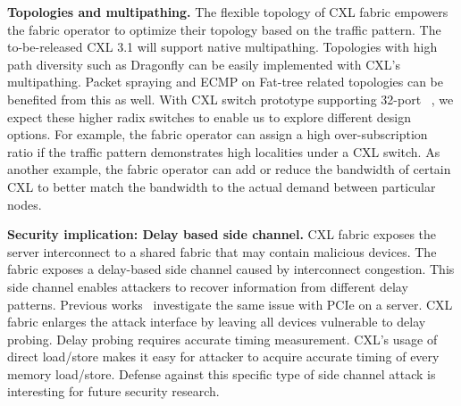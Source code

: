 \noindent \textbf{Topologies and multipathing.}
The flexible topology of CXL fabric empowers the fabric operator to optimize their topology based on the traffic pattern. 
%
The to-be-released CXL 3.1 will support native multipathing. Topologies with high path diversity such as Dragonfly can be easily implemented with CXL's multipathing. 
%
Packet spraying and ECMP on Fat-tree related topologies can be benefited from this as well.
%
With CXL switch prototype supporting 32-port ~\cite{xconn-cxl2-switch}, we expect these higher radix switches to enable us to explore different design options.
%
For example, the fabric operator can assign a high over-subscription ratio if the traffic pattern demonstrates high localities under a CXL switch. 
%
As another example, the fabric operator can add or reduce the bandwidth of certain CXL to better match the bandwidth to the actual demand between particular nodes. 

\noindent \textbf{Security implication: Delay based side channel.}
CXL fabric exposes the server interconnect to a shared fabric that may contain malicious devices.
%
The fabric exposes a delay-based side channel caused by interconnect congestion.
%
This side channel enables attackers to recover information from different delay patterns. 
%
Previous works~\cite{invisible-probe:oaklnad:2021} investigate the same issue with PCIe on a server. 
%
CXL fabric enlarges the attack interface by leaving all devices vulnerable to delay probing.
%
Delay probing requires accurate timing measurement.
%
CXL's usage of direct load/store makes it easy for attacker to acquire accurate timing of every memory load/store. 
%
Defense against this specific type of side channel attack is interesting for future security research. 
%

%
%

